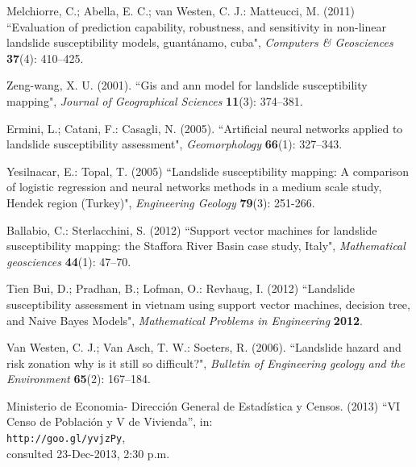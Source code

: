 \documentclass[11pt,twoside]{rmta2010eng}%
\begin{document}
\begin{thebibliography}{99}
Melchiorre, C.; Abella, E. C.; van Westen, C. J.: Matteucci, M. (2011)
``Evaluation of prediction capability, robustness, and sensitivity in
  non-linear landslide susceptibility models, guant\'{a}namo, cuba", 
{\it Computers {\&} Geosciences} {\bf 37}(4): 410--425.




Zeng-wang, X. U. (2001).
``Gis and ann model for landslide susceptibility mapping", 
{\it Journal of Geographical Sciences} {\bf 11}(3): 374--381.
  



Ermini, L.; Catani, F.: Casagli, N. (2005). 
``Artificial neural networks applied to landslide susceptibility assessment", 
{\it Geomorphology} {\bf 66}(1): 327--343.




Yesilnacar, E.: Topal, T. (2005)
``Landslide susceptibility mapping: A comparison of logistic regression and neural networks methods in a medium scale study, Hendek region (Turkey)", 
{\it Engineering Geology} {\bf 79}(3): 251-266.




Ballabio, C.: Sterlacchini, S. (2012) 
``Support vector machines for landslide susceptibility mapping: the Staffora River Basin case study, Italy", 
{\it Mathematical geosciences} {\bf 44}(1): 47--70.



Tien Bui, D.; Pradhan, B.; Lofman, O.: Revhaug, I. (2012)
``Landslide susceptibility assessment in vietnam using support vector machines, decision tree, and Naive Bayes Models", 
{\it Mathematical Problems in Engineering} {\bf 2012}.



Van Westen, C. J.; Van Asch, T. W.: Soeters, R. (2006).
``Landslide hazard and risk zonation why is it still so difficult?", 
{\it Bulletin of Engineering geology and the Environment} {\bf 65}(2): 167--184.




Ministerio de Economia- Direcci\'{o}n General de Estad\'{i}stica y Censos. (2013) 
``VI Censo de Poblaci\'{o}n y V de Vivienda'',
in:\\ {\tt http://goo.gl/yvjzPy},\\
consulted 23-Dec-2013, 2:30 p.m.





\end{thebibliography}
\end{document}
